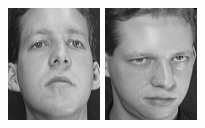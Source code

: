 \begin{figure}[ht]
 \includegraphics[width=\columnwidth/11]{ch3/figures/s1_9.png}
 \includegraphics[width=\columnwidth/11]{ch3/figures/s1_10.png}\\

\end{figure}
